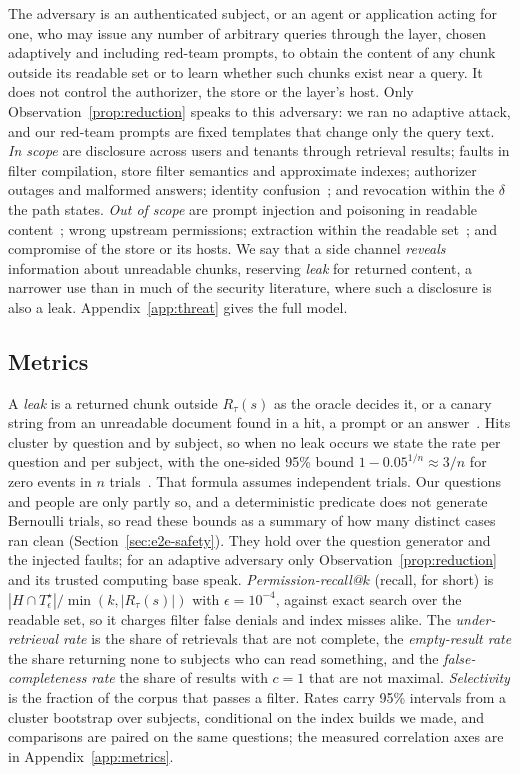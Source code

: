 The adversary is an authenticated subject, or an agent or application acting for one, who may issue any number of
arbitrary queries through the layer, chosen adaptively and including red-team prompts, to obtain the content of any
chunk outside its readable set or to learn whether such chunks exist near a query. It does not control the
authorizer, the store or the layer's host. Only Observation~\ref{prop:reduction} speaks to this adversary: we ran no adaptive
attack, and our red-team prompts are fixed templates that change only the query text. \emph{In scope} are disclosure across users and tenants through retrieval
results; faults in filter compilation, store filter semantics and approximate indexes; authorizer outages and malformed
answers; identity confusion~\cite{hardy1988confused}; and revocation within the $\delta$ the path states. \emph{Out of
scope} are prompt injection and poisoning in readable content~\cite{zou2025poisonedrag}; wrong upstream permissions;
extraction within the readable set~\cite{zeng2024good}; and compromise of the store or its hosts. We say that a side
channel \emph{reveals} information about unreadable chunks, reserving \emph{leak} for returned content, a narrower use than
in much of the security literature, where such a disclosure is also a leak.
Appendix~\ref{app:threat} gives the full model.

\subsection{Metrics}\label{sec:prob-metrics}

A \emph{leak} is a returned chunk outside $R_\tau(s)$ as the oracle decides it, or a canary string from an unreadable
document found in a hit, a prompt or an answer~\cite{carlini2019secret}. Hits cluster by question and by subject, so when
no leak occurs we state the rate per question and per subject, with the one-sided 95\% bound $1 - 0.05^{1/n} \approx 3/n$
for zero events in $n$ trials~\cite{hanley1983if}. That formula assumes independent trials. Our questions and people are only
partly so, and a deterministic predicate does not generate Bernoulli trials, so read these bounds as a summary of how many
distinct cases ran clean (Section~\ref{sec:e2e-safety}). They hold over the question generator and
the injected faults; for an adaptive adversary only Observation~\ref{prop:reduction} and its trusted computing base
speak. \emph{Permission-recall@$k$} (recall, for short) is $|H \cap T^\star_\epsilon| / \min(k, |R_\tau(s)|)$ with
$\epsilon = 10^{-4}$, against exact search over the readable set, so it charges filter false denials and index misses alike.
The \emph{under-retrieval rate} is the share of retrievals that are not complete, the \emph{empty-result rate} the share
returning none to subjects who can read something, and the \emph{false-completeness rate} the share of results with $c = 1$
that are not maximal. \emph{Selectivity} is the fraction of the corpus that passes a filter. Rates carry 95\% intervals from
a cluster bootstrap over subjects, conditional on the index builds we made, and comparisons are paired on the same questions;
the measured correlation axes are in Appendix~\ref{app:metrics}.
